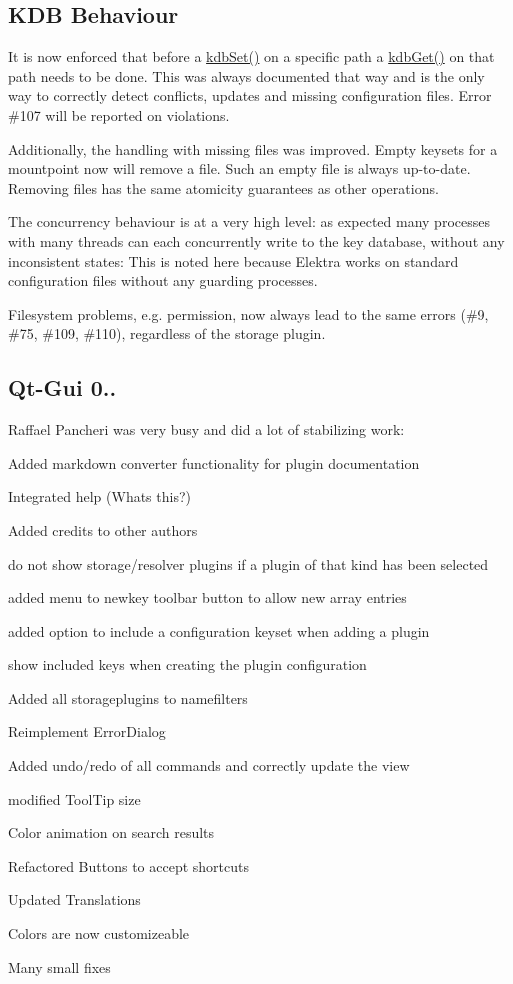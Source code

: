\subsection*{K\+DB Behaviour}

It is now enforced that before a \hyperlink{group__kdb_ga11436b058408f83d303ca5e996832bcf}{kdb\+Set()} on a specific path a \hyperlink{group__kdb_ga28e385fd9cb7ccfe0b2f1ed2f62453a1}{kdb\+Get()} on that path needs to be done. This was always documented that way and is the only way to correctly detect conflicts, updates and missing configuration files. Error \#107 will be reported on violations.

Additionally, the handling with missing files was improved. Empty keysets for a mountpoint now will remove a file. Such an empty file is always up-\/to-\/date. Removing files has the same atomicity guarantees as other operations.

The concurrency behaviour is at a very high level\+: as expected many processes with many threads can each concurrently write to the key database, without any inconsistent states\+: This is noted here because Elektra works on standard configuration files without any guarding processes.

Filesystem problems, e.\+g. permission, now always lead to the same errors (\#9, \#75, \#109, \#110), regardless of the storage plugin.

\subsection*{Qt-\/\+Gui 0..}

Raffael Pancheri was very busy and did a lot of stabilizing work\+:


\begin{DoxyItemize}
\item Added markdown converter functionality for plugin documentation
\item Integrated help (Whats this?)
\item Added credits to other authors
\item do not show storage/resolver plugins if a plugin of that kind has been selected
\item added menu to newkey toolbar button to allow new array entries
\item added option to include a configuration keyset when adding a plugin
\item show included keys when creating the plugin configuration
\item Added all storageplugins to namefilters
\item Reimplement Error\+Dialog
\item Added undo/redo of all commands and correctly update the view
\item modified Tool\+Tip size
\item Color animation on search results
\item Refactored Buttons to accept shortcuts
\item Updated Translations
\item Colors are now customizeable
\item Many small fixes
\end{DoxyItemize}

